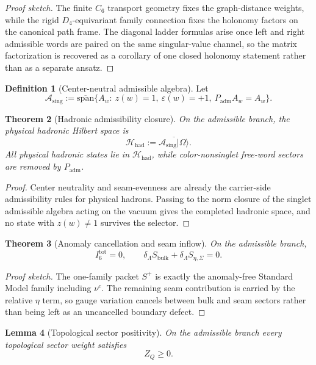 \documentclass[11pt,a4paper]{article}
\newtheorem{theorem}{Theorem}[section]
\newtheorem{lemma}[theorem]{Lemma}
\theoremstyle{definition}
\newtheorem{definition}[theorem]{Definition}
\theoremstyle{remark}
\newcommand{\Seam}{\Sigma}
\newcommand{\Asing}{\mathcal A_{\mathrm{sing}}}
\newcommand{\Hhad}{\mathcal H_{\mathrm{had}}}
\newcommand{\Padm}{P_{\mathrm{adm}}}
\begin{document}
\begin{proof}[Proof sketch]
The finite $C_6$ transport geometry fixes the graph-distance weights, while the rigid
$D_4$-equivariant family connection fixes the holonomy factors on the canonical path frame. The
diagonal ladder formulas arise once left and right admissible words are paired on the same
singular-value channel, so the matrix factorization is recovered as a corollary of one closed
holonomy statement rather than as a separate ansatz.
\end{proof}

\begin{definition}[Center-neutral admissible algebra]
Let
\[
\Asing
:=
\overline{\mathrm{span}}\{A_w:\ z(w)=1,\ \varepsilon(w)=+1,\ \Padm A_w=A_w\}.
\]
\end{definition}

\begin{theorem}[Hadronic admissibility closure]
On the admissible branch, the physical hadronic Hilbert space is
\[
\Hhad:=\overline{\Asing|\Omega\rangle}.
\]
All physical hadronic states lie in $\Hhad$, while color-nonsinglet free-word sectors are removed by $\Padm$.
\end{theorem}

\begin{proof}
Center neutrality and seam-evenness are already the carrier-side admissibility rules for physical hadrons. Passing to the norm closure of the singlet admissible algebra acting on the vacuum gives the completed hadronic space, and no state with $z(w)\neq 1$ survives the selector.
\end{proof}

\begin{theorem}[Anomaly cancellation and seam inflow]
On the admissible branch,
\[
I_6^{\mathrm{tot}}=0,
\qquad
\delta_\Lambda S_{\mathrm{bulk}}+\delta_\Lambda S_{\eta,\Seam}=0.
\]
\end{theorem}

\begin{proof}[Proof sketch]
The one-family packet $S^+$ is exactly the anomaly-free Standard Model family including $\nu^c$. The remaining seam contribution is carried by the relative $\eta$ term, so gauge variation cancels between bulk and seam sectors rather than being left as an uncancelled boundary defect.
\end{proof}

\begin{lemma}[Topological sector positivity]
\label{lem:topological-sector-positivity}
On the admissible branch every topological sector weight satisfies
\[
Z_Q\ge 0.
\]
\end{lemma}
\end{document}
